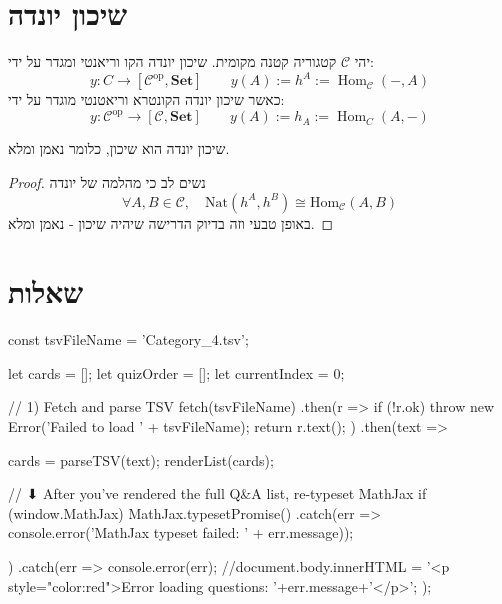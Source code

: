 \documentclass{tstextbook}
\begin{document}
\section{שיכון יונדה}

\begin{definition}
יהי \(\mathcal{C}\) קטגוריה קטנה מקומית. שיכון יונדה הקו וריאנטי ומגדר על ידי:
$$y:C\longrightarrow\left[ \mathcal{C} ^{\mathrm{op}},\mathbf{Set} \right]\qquad y(A):=h^{A}:=\operatorname{Hom}_{\mathcal{C} }(-,A)$$
כאשר שיכון יונדה הקונטרא וריאטנטי מוגדר על ידי:
$$y:{\mathcal{C}}^{\mathrm{op}}\longrightarrow\left[ {\mathcal{C}},\mathbf{Set} \right]\qquad y(A):=h_{A}:=\operatorname{Hom}_{C}(A,-)$$

\end{definition}
\begin{proposition}
שיכון יונדה הוא שיכון, כלומר נאמן ומלא. 

\end{proposition}
\begin{proof}
נשים לב כי מהלמה של יונדה
$$\forall A,B\in{\mathcal{C}},\quad\mathrm{{Nat}}(h^{A},h^{B})\cong\mathrm{Hom}_{{\mathcal{C}}}(A,B)$$
באופן טבעי וזה בדיוק הדרישה שיהיה שיכון - נאמן ומלא.

\end{proof}
\section{שאלות}


    const tsvFileName = 'Category_4.tsv';

    let cards = [];
    let quizOrder = [];
    let currentIndex = 0;

    // 1) Fetch and parse TSV
fetch(tsvFileName)
  .then(r => {
    if (!r.ok) throw new Error('Failed to load ' + tsvFileName);
    return r.text();
  })
  .then(text => {
    cards = parseTSV(text);
    renderList(cards);

    // ⬇ After you’ve rendered the full Q&A list, re-typeset MathJax
    if (window.MathJax) {
      MathJax.typesetPromise()
        .catch(err => console.error('MathJax typeset failed: ' + err.message));
    }
  })
  .catch(err => {
    console.error(err);
    //document.body.innerHTML =  '<p style="color:red">Error loading questions: '+err.message+'</p>';
  });
\end{document}

